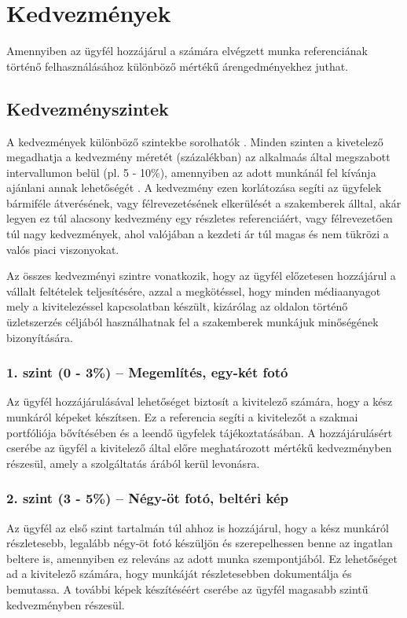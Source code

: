 \section{Kedvezmények}


\newcommand{\sorSzamKe}{\stepcounter{Kecounter}\theKecounter}

Amennyiben az ügyfél hozzájárul a számára elvégzett munka referenciának történő felhasználásához különböző mértékű árengedményekhez juthat.

\subsection{Kedvezményszintek}
A kedvezmények különböző szintekbe sorolhatók \kovAzon{KE\_\sorSzamKe}. Minden szinten a kivetelező megadhatja
a kedvezmény méretét (százalékban) az alkalmaás által megszabott intervallumon belül (pl. 5 - 10\%), amennyiben az adott munkánál fel kívánja ajánlani annak lehetőségét \kovAzon{KE\_\sorSzamKe}. 
A kedvezmény ezen korlátozása segíti az ügyfelek bármiféle átverésének, vagy félrevezetésének elkerülését a
szakemberek álltal, akár legyen ez túl alacsony kedvezmény egy részletes referenciáért, vagy félrevezetően túl nagy kedvezmények, ahol valójában a kezdeti ár túl magas és nem tükrözi a valós piaci viszonyokat.

Az összes kedvezményi szintre vonatkozik, hogy az ügyfél előzetesen hozzájárul a vállalt feltételek teljesítésére, azzal a megkötéssel, hogy minden médiaanyagot mely a kivitelezéssel kapcsolatban készült, kizárólag az oldalon történő üzletszerzés céljából használhatnak fel a szakemberek munkájuk minőségének bizonyítására.

\subsubsection{1. szint (0 - 3\%) – Megemlítés, egy-két fotó} 
Az ügyfél hozzájárulásával lehetőséget biztosít a kivitelező számára, hogy a kész munkáról képeket készítsen. Ez a referencia segíti a kivitelezőt a szakmai portfóliója bővítésében és a leendő ügyfelek tájékoztatásában. A hozzájárulásért cserébe az ügyfél a kivitelező által előre meghatározott mértékű kedvezményben részesül, amely a szolgáltatás árából kerül levonásra.

\subsubsection{2. szint (3 - 5\%) – Négy-öt fotó, beltéri kép} 
Az ügyfél az első szint tartalmán túl ahhoz is hozzájárul, hogy a kész munkáról részletesebb, legalább négy-öt fotó készüljön és szerepelhessen benne az ingatlan beltere is, amennyiben ez releváns az adott munka szempontjából. Ez lehetőséget ad a kivitelező számára, hogy munkáját részletesebben dokumentálja és bemutassa. A további képek készítéséért cserébe az ügyfél magasabb szintű kedvezményben részesül.

